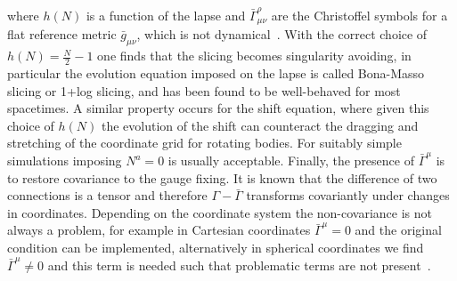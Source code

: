 \documentclass[10pt]{report}
\theoremstyle{definition}
\begin{document}
where $h(N)$ is a function of the lapse and $\bar{\Gamma}^\rho_{\mu\nu}$ are the Christoffel symbols for a flat reference metric $\bar{g}_{\mu\nu}$, which is not dynamical~\cite{Generalized_har_Alcubi_2005}. With the correct choice of $h(N) = \frac{N}{2} - 1$ one finds that the slicing becomes singularity avoiding, in particular the evolution equation imposed on the lapse is called Bona-Masso slicing or 1+log slicing, and has been found to be well-behaved for most spacetimes. A similar property occurs for the shift equation, where given this choice of $h(N)$ the evolution of the shift can counteract the dragging and stretching of the coordinate grid for rotating bodies. For suitably simple simulations imposing $N^a = 0$ is usually acceptable. Finally, the presence of $\bar{\Gamma}^\mu$ is to restore covariance to the gauge fixing. It is known that the difference of two connections is a tensor and therefore $\Gamma - \bar{\Gamma}$ transforms covariantly under changes in coordinates. Depending on the coordinate system the non-covariance is not always a problem, for example in Cartesian coordinates $\bar{\Gamma}^\mu = 0$ and the original condition can be implemented, alternatively in spherical coordinates we find $\bar{\Gamma}^\mu \neq 0$  and this term is needed such that problematic terms are not present~\cite{Generalized_har_Sorkin_2009}.
\end{document}
